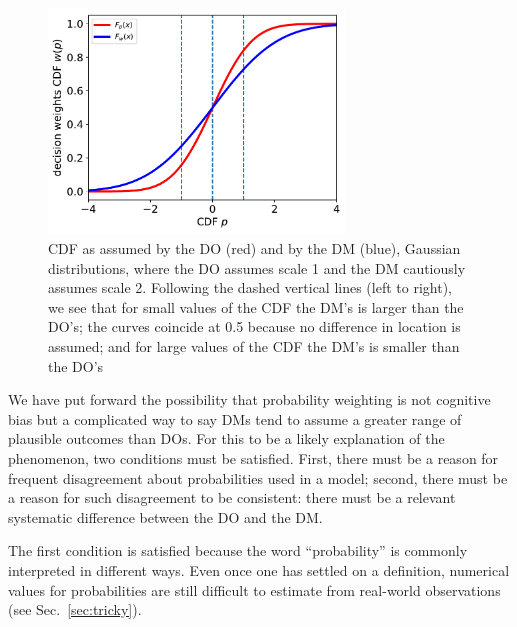 \documentclass[11pt]{article}
\newcommand{\sref}[1]{Sec.~\ref{sec:#1}}
\newcommand{\flabel}[1]{\label{fig:#1}}
\newcommand{\ND}{\mathcal{N}} %
\numberwithin{equation}{section}
\begin{document}


\begin{figure}[!htb]
\centering
\includegraphics[width=0.7\textwidth]{./figs/decision_map.pdf}
\caption{CDF as assumed by the DO (red) and by the DM (blue), Gaussian distributions, where the DO assumes scale 1 and the DM cautiously assumes scale 2. Following the dashed vertical lines (left to right), we see that for small values of the CDF the DM's is larger than the DO's; the curves coincide at 0.5 because no difference in location is assumed; and for large values of the CDF the DM's is smaller than the DO's }
\flabel{decision_map}
\end{figure}


We have put forward the possibility that probability weighting is not cognitive bias but a complicated way to say DMs tend to assume a greater range of plausible outcomes than DOs. For this to be a likely explanation of the phenomenon, two conditions must be satisfied. First, there must be a reason for frequent disagreement about probabilities used in a model; second, there must be a reason for such disagreement to be consistent: there must be a relevant systematic difference between the DO and the DM. 

The first condition is satisfied because the word ``probability'' is commonly interpreted in different ways. Even once one has settled on a definition, numerical values for probabilities are still difficult to estimate from real-world observations (see \sref{tricky}).
\end{document}
